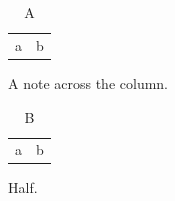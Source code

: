 \documentclass[twocolumn]{article}
\begin{document}
\begin{table}
\caption{A}
\begin{tabular}{ll}a&b\\\end{tabular}

\parbox{\linewidth}{A note across the column.}
\end{table}
\begin{table}
\caption{B}
\begin{tabular}{ll}a&b\\\end{tabular}

\parbox{0.5\columnwidth}{Half.}
\end{table}
\end{document}
